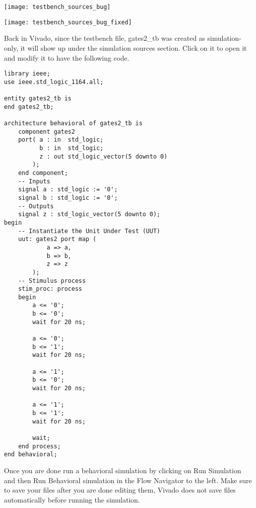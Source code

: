 \vspace{3mm}
\noindent
\begin{minipage}[b]{0.45\textwidth}
    \centering
    \texttt{[image: testbench\_sources\_bug]}
\end{minipage}
\hfill
\begin{minipage}[b]{0.45\textwidth}
    \centering
    \texttt{[image: testbench\_sources\_bug\_fixed]}
\end{minipage}
\vspace{1mm}

Back in Vivado, since the testbench file, gates2\_tb was created as simulation-only,
it will show up under the simulation sources section.
Click on it to open it and modify it to have the following code.

\noindent
\begin{minipage}{\textwidth}
\begin{verbatim}
library ieee;
use ieee.std_logic_1164.all;

entity gates2_tb is
end gates2_tb;

architecture behavioral of gates2_tb is
    component gates2
    port( a : in  std_logic;
          b : in  std_logic;
          z : out std_logic_vector(5 downto 0)
        );
    end component;
    -- Inputs
    signal a : std_logic := '0';
    signal b : std_logic := '0';
    -- Outputs
    signal z : std_logic_vector(5 downto 0);
begin
    -- Instantiate the Unit Under Test (UUT)
    uut: gates2 port map (
            a => a,
            b => b,
            z => z
        );
    -- Stimulus process
    stim_proc: process
    begin
        a <= '0';
        b <= '0';
        wait for 20 ns;

        a <= '0';
        b <= '1';
        wait for 20 ns;

        a <= '1';
        b <= '0';
        wait for 20 ns;

        a <= '1';
        b <= '1';
        wait for 20 ns;

        wait;
    end process;
end behavioral;
\end{verbatim}
\end{minipage}
\strut

Once you are done run a behavioral simulation by clicking on Run Simulation and then Run
Behavioral simulation in the Flow Navigator to the left.
Make sure to save your files after you are done editing them, Vivado does not save files
automatically before running the simulation.

